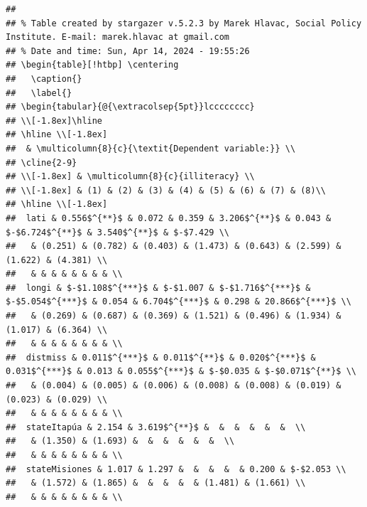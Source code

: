 \documentclass[
  a4paper,
]{article}
\begin{document}
\begin{verbatim}
## 
## % Table created by stargazer v.5.2.3 by Marek Hlavac, Social Policy Institute. E-mail: marek.hlavac at gmail.com
## % Date and time: Sun, Apr 14, 2024 - 19:55:26
## \begin{table}[!htbp] \centering 
##   \caption{} 
##   \label{} 
## \begin{tabular}{@{\extracolsep{5pt}}lcccccccc} 
## \\[-1.8ex]\hline 
## \hline \\[-1.8ex] 
##  & \multicolumn{8}{c}{\textit{Dependent variable:}} \\ 
## \cline{2-9} 
## \\[-1.8ex] & \multicolumn{8}{c}{illiteracy} \\ 
## \\[-1.8ex] & (1) & (2) & (3) & (4) & (5) & (6) & (7) & (8)\\ 
## \hline \\[-1.8ex] 
##  lati & 0.556$^{**}$ & 0.072 & 0.359 & 3.206$^{**}$ & 0.043 & $-$6.724$^{**}$ & 3.540$^{**}$ & $-$7.429 \\ 
##   & (0.251) & (0.782) & (0.403) & (1.473) & (0.643) & (2.599) & (1.622) & (4.381) \\ 
##   & & & & & & & & \\ 
##  longi & $-$1.108$^{***}$ & $-$1.007 & $-$1.716$^{***}$ & $-$5.054$^{***}$ & 0.054 & 6.704$^{***}$ & 0.298 & 20.866$^{***}$ \\ 
##   & (0.269) & (0.687) & (0.369) & (1.521) & (0.496) & (1.934) & (1.017) & (6.364) \\ 
##   & & & & & & & & \\ 
##  distmiss & 0.011$^{***}$ & 0.011$^{**}$ & 0.020$^{***}$ & 0.031$^{***}$ & 0.013 & 0.055$^{***}$ & $-$0.035 & $-$0.071$^{**}$ \\ 
##   & (0.004) & (0.005) & (0.006) & (0.008) & (0.008) & (0.019) & (0.023) & (0.029) \\ 
##   & & & & & & & & \\ 
##  stateItapúa & 2.154 & 3.619$^{**}$ &  &  &  &  &  &  \\ 
##   & (1.350) & (1.693) &  &  &  &  &  &  \\ 
##   & & & & & & & & \\ 
##  stateMisiones & 1.017 & 1.297 &  &  &  &  & 0.200 & $-$2.053 \\ 
##   & (1.572) & (1.865) &  &  &  &  & (1.481) & (1.661) \\ 
##   & & & & & & & & \\ 

\end{verbatim}
\end{document}
